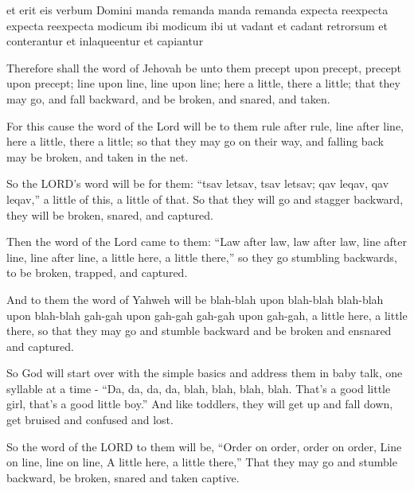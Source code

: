 			\begin{framed}
			\scriptsize
				\begin{compactdesc}
					\item[BHS] 
					\item[LXX] 
					\item[BSV] et erit eis verbum Domini manda remanda manda remanda expecta reexpecta expecta reexpecta modicum ibi modicum ibi ut vadant et cadant retrorsum et conterantur et inlaqueentur et capiantur
					\item[ASV] Therefore shall the word of Jehovah be unto them precept upon precept, precept upon precept; line upon line, line upon line; here a little, there a little; that they may go, and fall backward, and be broken, and snared, and taken.
					\item[BBE] For this cause the word of the Lord will be to them rule after rule, line after line, here a little, there a little; so that they may go on their way, and falling back may be broken, and taken in the net.
					\item[CEB] So the LORD's word will be for them: ``tsav letsav, tsav letsav; qav leqav, qav leqav,'' a little of this, a little of that. So that they will go and stagger backward, they will be broken, snared, and captured.
					\item[HCSB] Then the word of the Lord came to them: ``Law after law, law after law, line after line, line after line, a little here, a little there,'' so they go stumbling backwards, to be broken, trapped, and captured.
					\item[LEB] And to them the word of Yahweh will be blah-blah upon blah-blah blah-blah upon blah-blah gah-gah upon gah-gah gah-gah upon gah-gah, a little here, a little there, so that they may go and stumble backward and be broken and ensnared and captured.
					\item[TMB] So God will start over with the simple basics and address them in baby talk, one syllable at a time - ``Da, da, da, da, blah, blah, blah, blah. That's a good little girl, that's a good little boy.'' And like toddlers, they will get up and fall down, get bruised and confused and lost.
					\item[NASB] So the word of the LORD to them will be, ``Order on order, order on order, Line on line, line on line, A little here, a little there,'' That they may go and stumble backward, be broken, snared and taken captive.

\end{compactdesc}
\end{framed}
